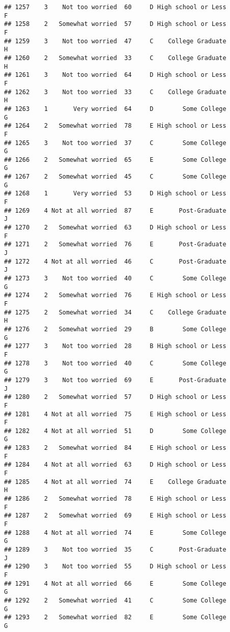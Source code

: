 \documentclass[
]{article}
\begin{document}
\begin{verbatim}
## 1257    3    Not too worried  60     D High school or Less         F
## 1258    2   Somewhat worried  57     D High school or Less         F
## 1259    3    Not too worried  47     C    College Graduate         H
## 1260    2   Somewhat worried  33     C    College Graduate         H
## 1261    3    Not too worried  64     D High school or Less         F
## 1262    3    Not too worried  33     C    College Graduate         H
## 1263    1       Very worried  64     D        Some College         G
## 1264    2   Somewhat worried  78     E High school or Less         F
## 1265    3    Not too worried  37     C        Some College         G
## 1266    2   Somewhat worried  65     E        Some College         G
## 1267    2   Somewhat worried  45     C        Some College         G
## 1268    1       Very worried  53     D High school or Less         F
## 1269    4 Not at all worried  87     E       Post-Graduate         J
## 1270    2   Somewhat worried  63     D High school or Less         F
## 1271    2   Somewhat worried  76     E       Post-Graduate         J
## 1272    4 Not at all worried  46     C       Post-Graduate         J
## 1273    3    Not too worried  40     C        Some College         G
## 1274    2   Somewhat worried  76     E High school or Less         F
## 1275    2   Somewhat worried  34     C    College Graduate         H
## 1276    2   Somewhat worried  29     B        Some College         G
## 1277    3    Not too worried  28     B High school or Less         F
## 1278    3    Not too worried  40     C        Some College         G
## 1279    3    Not too worried  69     E       Post-Graduate         J
## 1280    2   Somewhat worried  57     D High school or Less         F
## 1281    4 Not at all worried  75     E High school or Less         F
## 1282    4 Not at all worried  51     D        Some College         G
## 1283    2   Somewhat worried  84     E High school or Less         F
## 1284    4 Not at all worried  63     D High school or Less         F
## 1285    4 Not at all worried  74     E    College Graduate         H
## 1286    2   Somewhat worried  78     E High school or Less         F
## 1287    2   Somewhat worried  69     E High school or Less         F
## 1288    4 Not at all worried  74     E        Some College         G
## 1289    3    Not too worried  35     C       Post-Graduate         J
## 1290    3    Not too worried  55     D High school or Less         F
## 1291    4 Not at all worried  66     E        Some College         G
## 1292    2   Somewhat worried  41     C        Some College         G
## 1293    2   Somewhat worried  82     E        Some College         G

\end{verbatim}
\end{document}
